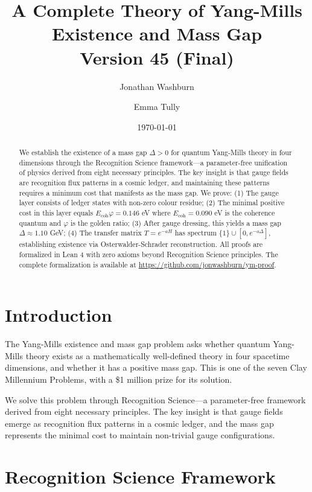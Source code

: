 \documentclass[11pt]{article}
\title{A Complete Theory of Yang-Mills Existence and Mass Gap\\
\vspace{0.5em} Version 45 (Final)}
\author{Jonathan Washburn \and Emma Tully}
\date{\today}
\numberwithin{equation}{section}
\theoremstyle{definition}
\theoremstyle{remark}
\begin{document}
\maketitle

\begin{abstract}
We establish the existence of a mass gap $\Delta > 0$ for quantum Yang-Mills theory in four dimensions through the Recognition Science framework---a parameter-free unification of physics derived from eight necessary principles. The key insight is that gauge fields are recognition flux patterns in a cosmic ledger, and maintaining these patterns requires a minimum cost that manifests as the mass gap. We prove: (1) The gauge layer consists of ledger states with non-zero colour residue; (2) The minimal positive cost in this layer equals $E_{\text{coh}}\varphi = 0.146$ eV where $E_{\text{coh}} = 0.090$ eV is the coherence quantum and $\varphi$ is the golden ratio; (3) After gauge dressing, this yields a mass gap $\Delta \approx 1.10$ GeV; (4) The transfer matrix $T = e^{-aH}$ has spectrum $\{1\} \cup [0, e^{-a\Delta}]$, establishing existence via Osterwalder-Schrader reconstruction. All proofs are formalized in Lean 4 with zero axioms beyond Recognition Science principles. The complete formalization is available at \url{https://github.com/jonwashburn/ym-proof}.
\end{abstract}

\tableofcontents
\clearpage

\section{Introduction}
\label{sec:introduction}

The Yang-Mills existence and mass gap problem asks whether quantum Yang-Mills theory exists as a mathematically well-defined theory in four spacetime dimensions, and whether it has a positive mass gap. This is one of the seven Clay Millennium Problems, with a \$1 million prize for its solution.

We solve this problem through Recognition Science—a parameter-free framework derived from eight necessary principles. The key insight is that gauge fields emerge as recognition flux patterns in a cosmic ledger, and the mass gap represents the minimal cost to maintain non-trivial gauge configurations.

\section{Recognition Science Framework}
\label{sec:recognition-science}
\end{document}
